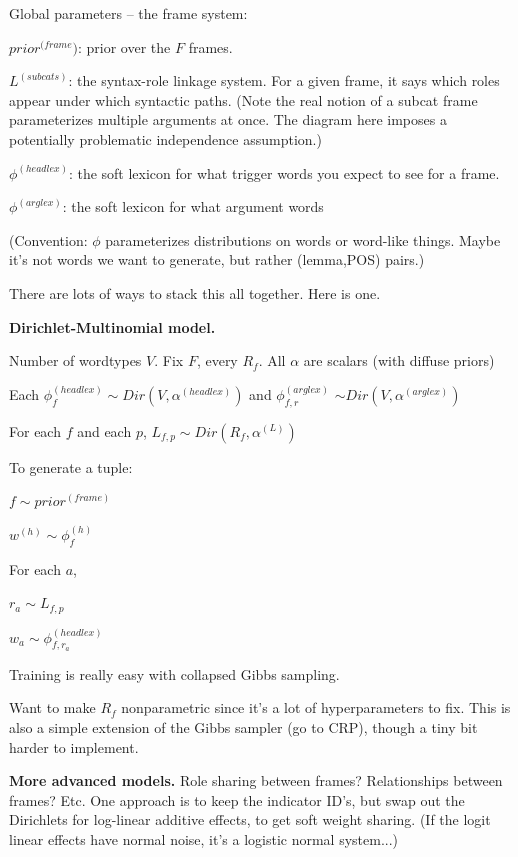 \documentclass[11pt,letterpaper]{article}
\newenvironment{itemizesquish}{\begin{list}{\labelitemi}{\setlength{\itemsep}{0em}\setlength{\labelwidth}{0.5em}\setlength{\leftmargin}{\labelwidth}\addtolength{\leftmargin}{\labelsep}}}{\end{list}}
\begin{document}
Global parameters -- the frame system:

\begin{itemizesquish}
  \item $prior^{(frame})$: prior over the $F$ frames.
  \item $L^{(subcats)}$: the syntax-role linkage system.  For a given frame, it says which roles appear under which syntactic paths.  (Note the real notion of a subcat frame parameterizes multiple arguments at once.  The diagram here imposes a potentially problematic independence assumption.)
  \item $\phi^{(headlex)}$: the soft lexicon for what trigger words you expect to see for a frame.

  \item $\phi^{(arglex)}$: the soft lexicon for what argument words
\end{itemizesquish}

(Convention: $\phi$ parameterizes distributions on words or word-like things.  
Maybe it's not words we want to generate, but rather (lemma,POS) pairs.)

There are lots of ways to stack this all together.  Here is one.

\textbf{Dirichlet-Multinomial model.}

Number of wordtypes $V$.  Fix $F$, every $R_f$.  All $\alpha$ are scalars (with diffuse priors)

\begin{itemizesquish}
  \item Each $\phi^{(headlex)}_f \sim Dir(V, \alpha^{(headlex)})$ and $\phi^{(arglex)}_{f,r}$ $\sim Dir(V, \alpha^{(arglex)})$
  \item For each $f$ and each $p$, $L_{f,p} \sim Dir(R_f, \alpha^{(L)})$
\end{itemizesquish}

To generate a tuple:

\begin{itemizesquish}
  \item $f \sim prior^{(frame)}$
  \item $w^{(h)} \sim \phi^{(h)}_f$
  \item For each $a$,
  \begin{itemizesquish}
    \item $r_a \sim L_{f,p}$
    \item $w_a \sim \phi^{(headlex)}_{f,r_a}$
  \end{itemizesquish}
\end{itemizesquish}

Training is really easy with collapsed Gibbs sampling.

Want to make $R_f$ nonparametric since it's a lot of hyperparameters to fix.
This is also a simple extension of the Gibbs sampler (go to CRP), though a tiny bit
harder to implement.


\textbf{More advanced models.}  Role sharing between frames?  Relationships between frames?  Etc.  One approach is to keep the indicator ID's, but swap out the Dirichlets for log-linear additive effects, to get soft weight sharing.  (If the logit linear effects have normal noise, it's a logistic normal system...)

% 
% 
\end{document}
